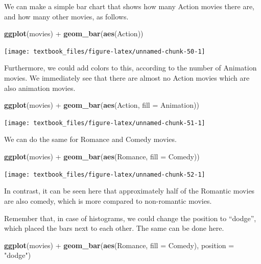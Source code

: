 \documentclass[]{tufte-book}
\newenvironment{Shaded}{}{}
\newcommand{\DataTypeTok}[1]{\textcolor[rgb]{0.56,0.13,0.00}{#1}}
\newcommand{\KeywordTok}[1]{\textcolor[rgb]{0.00,0.44,0.13}{\textbf{#1}}}
\newcommand{\NormalTok}[1]{#1}
\newcommand{\OperatorTok}[1]{\textcolor[rgb]{0.40,0.40,0.40}{#1}}
\newcommand{\StringTok}[1]{\textcolor[rgb]{0.25,0.44,0.63}{#1}}
\begin{document}
We can make a simple bar chart that shows how many Action movies there are, and how many other movies, as follows.

\begin{Shaded}
\begin{Highlighting}[]
\KeywordTok{ggplot}\NormalTok{(movies) }\OperatorTok{+}
\StringTok{    }\KeywordTok{geom_bar}\NormalTok{(}\KeywordTok{aes}\NormalTok{(Action))}
\end{Highlighting}
\end{Shaded}

\texttt{[image: textbook\_files/figure-latex/unnamed-chunk-50-1]}

Furthermore, we could add colors to this, according to the number of Animation movies. We immediately see that there are almost no Action movies which are also animation movies.

\begin{Shaded}
\begin{Highlighting}[]
\KeywordTok{ggplot}\NormalTok{(movies) }\OperatorTok{+}
\StringTok{    }\KeywordTok{geom_bar}\NormalTok{(}\KeywordTok{aes}\NormalTok{(Action, }\DataTypeTok{fill =}\NormalTok{ Animation)) }
\end{Highlighting}
\end{Shaded}

\texttt{[image: textbook\_files/figure-latex/unnamed-chunk-51-1]}

We can do the same for Romance and Comedy movies.

\begin{Shaded}
\begin{Highlighting}[]
\KeywordTok{ggplot}\NormalTok{(movies) }\OperatorTok{+}
\StringTok{    }\KeywordTok{geom_bar}\NormalTok{(}\KeywordTok{aes}\NormalTok{(Romance, }\DataTypeTok{fill =}\NormalTok{ Comedy)) }
\end{Highlighting}
\end{Shaded}

\texttt{[image: textbook\_files/figure-latex/unnamed-chunk-52-1]}

In contrast, it can be seen here that approximately half of the Romantic movies are also comedy, which is more compared to non-romantic movies.

Remember that, in case of histograms, we could change the position to ``dodge'', which placed the bars next to each other. The same can be done here.

\begin{Shaded}
\begin{Highlighting}[]
\KeywordTok{ggplot}\NormalTok{(movies) }\OperatorTok{+}
\StringTok{    }\KeywordTok{geom_bar}\NormalTok{(}\KeywordTok{aes}\NormalTok{(Romance, }\DataTypeTok{fill =}\NormalTok{ Comedy), }\DataTypeTok{position =} \StringTok{"dodge"}\NormalTok{) }
\end{Highlighting}
\end{Shaded}
\end{document}
